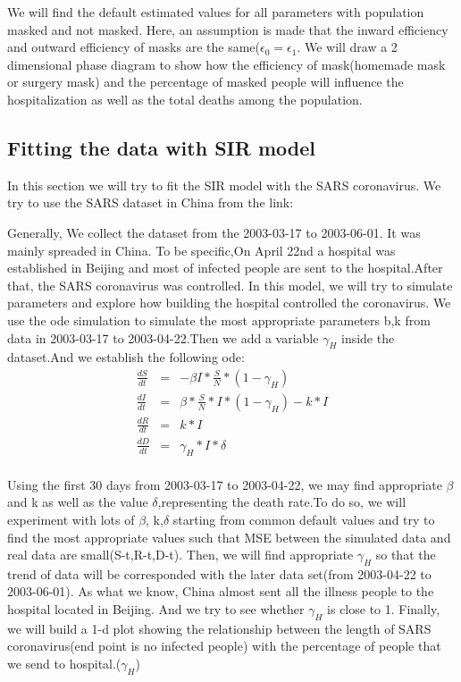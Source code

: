 \documentclass{article}
\begin{document}
We will find the default estimated values for all parameters with population masked and not masked.
Here, an assumption is made that the inward efficiency and outward efficiency of masks are the same($\epsilon_{0} = \epsilon_{1}$. We will draw a 2 dimensional phase diagram to show how the efficiency of mask(homemade mask or surgery mask) and the percentage of masked people will influence the hospitalization as well as the total deaths among the population.





\subsection{Fitting the data with SIR model}
In this section we will try to fit the SIR model with the SARS  coronavirus. We try to use the SARS dataset in China from the link:\cite{SARSsource}

Generally, We collect the dataset from the 2003-03-17 to 2003-06-01. It was mainly spreaded in China. To be specific,On April 22nd a hospital was established in Beijing and most of infected people are sent to the hospital.After that, the SARS coronavirus was controlled. In this model, we will try to simulate parameters and explore how building the hospital controlled the coronavirus. We use the ode simulation to simulate the most appropriate parameters b,k from data in 2003-03-17 to 2003-04-22.Then we add a variable $\gamma_{H}$ inside the dataset.And we establish the following ode:
\begin{eqnarray}
  \frac{dS}{dt} &=& -\beta I*\frac{S}{N}*(1-\gamma_{H})\\
  \frac{dI}{dt} &=& \beta *\frac{S}{N}*I*(1-\gamma_{H})- k*I\\
  \frac{dR}{dt} &=& k*I\\
  \frac{dD}{dt} &=& \gamma_{H}*I*\delta\\
\end{eqnarray}

Using the first 30 days from 2003-03-17 to 2003-04-22, we may find appropriate $\beta$ and k as well as the value $\delta$,representing the death rate.To do so, we will experiment with lots of $\beta$, k,$\delta$ starting from common default values and try to find the most appropriate values such that MSE between the simulated data and real data are small(S-t,R-t,D-t).  Then, we will find appropriate $\gamma_{H}$ so that the trend of data will be corresponded with the later data set(from  2003-04-22 to 2003-06-01). As what we know, China almost sent all the illness people to the hospital located in Beijing. And we try to see whether $\gamma_{H}$ is close to 1.
Finally, we will build a 1-d plot showing the relationship between the length of SARS coronavirus(end point is no infected people) with the percentage of people that we send to hospital.($\gamma_{H}$)
\end{document}
